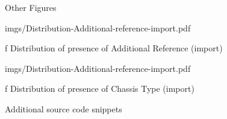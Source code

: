 \app Other Figures

\medskip
{}
\picw=15cm \cinspic imgs/Distribution-Additional-reference-import.pdf
\caption/f Distribution of presence of Additional Reference (import)
\medskip

\medskip
{}
\picw=15cm \cinspic imgs/Distribution-Additional-reference-import.pdf
\caption/f Distribution of presence of Chassis Type (import)
\medskip

\app Additional source code snippets